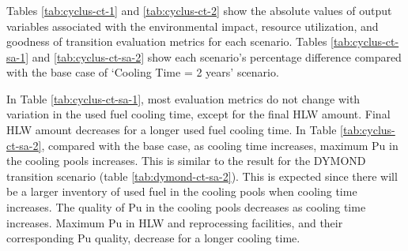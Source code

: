 \begin{table}[]
        \end{table}

    
\subsubsection{\textbf{\Cyclus}}

Tables \ref{tab:cyclus-ct-1} and \ref{tab:cyclus-ct-2} show 
the absolute values of 
output variables associated with the environmental impact, 
resource utilization, and goodness of transition evaluation 
metrics for each scenario. 
Tables \ref{tab:cyclus-ct-sa-1} and \ref{tab:cyclus-ct-sa-2} 
show each scenario's percentage 
difference compared with the base case of `Cooling Time = 2 years'
scenario.

In Table \ref{tab:cyclus-ct-sa-1}, most evaluation metrics do not change 
with variation in the used fuel cooling time, except for the final 
HLW amount. 
Final HLW amount decreases for a longer used fuel cooling time.
In Table \ref{tab:cyclus-ct-sa-2}, compared with the base case, 
as cooling time increases, maximum Pu in the cooling pools increases.
This is similar to the result for the DYMOND transition scenario (table 
\ref{tab:dymond-ct-sa-2}). 
This is expected since there will be a larger inventory of used fuel 
in the cooling pools when cooling time increases. 
The quality of Pu in the cooling pools decreases as cooling time 
increases. 
Maximum Pu in HLW and reprocessing facilities, and their corresponding 
Pu quality, decrease for a longer cooling time. 

